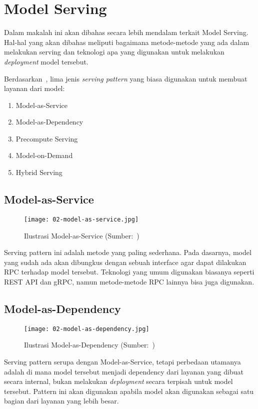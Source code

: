 \section{Model Serving}

Dalam makalah ini akan dibahas secara lebih mendalam terkait Model Serving.
Hal-hal yang akan dibahas meliputi bagaimana metode-metode yang ada dalam melakukan serving dan teknologi apa yang digunakan untuk melakukan \textit{deployment} model tersebut.

Berdasarkan~\cite{mlopsorg}, lima jenis \textit{serving pattern} yang biasa digunakan untuk membuat layanan dari model:
\begin{enumerate}
  \item Model-as-Service
  \item Model-as-Dependency
  \item Precompute Serving
  \item Model-on-Demand
  \item Hybrid Serving
\end{enumerate}

\subsection{Model-as-Service}

\begin{figure}
  \centering
  \texttt{[image: 02-model-as-service.jpg]}
  \caption{Ilustrasi Model-as-Service (Sumber:~\cite{book-handsonml})}
\end{figure}

Serving pattern ini adalah metode yang paling sederhana.
Pada dasarnya, model yang sudah ada akan dibungkus dengan sebuah interface agar dapat dilakukan RPC terhadap model tersebut.
Teknologi yang umum digunakan biasanya seperti REST API dan gRPC, namun metode-metode RPC lainnya bisa juga digunakan.

\subsection{Model-as-Dependency}

\begin{figure}
  \centering
  \texttt{[image: 02-model-as-dependency.jpg]}
  \caption{Ilustrasi Model-as-Dependency (Sumber:~\cite{book-handsonml})}
\end{figure}

Serving pattern serupa dengan Model-as-Service, tetapi perbedaan utamanya adalah di mana model tersebut menjadi dependency dari layanan yang dibuat secara internal, bukan melakukan \textit{deployment} secara terpisah untuk model tersebut.
Pattern ini akan digunakan apabila model akan digunakan sebagai satu bagian dari layanan yang lebih besar.

